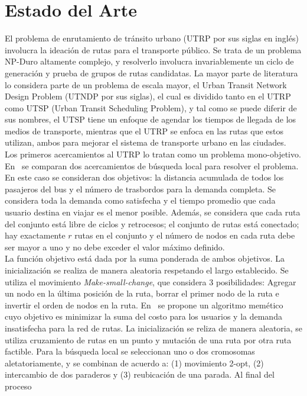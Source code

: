 \documentclass{llncs}
\begin{document}
\section{Estado del Arte}
El problema de enrutamiento de tr\'ansito urbano (UTRP por sus siglas en ingl\'es) involucra la ideaci\'on de rutas para el transporte p\'ublico.
Se trata de un problema NP-Duro altamente complejo, y resolverlo involucra invariablemente un ciclo de
generaci\'on y prueba de grupos de rutas candidatas. La mayor parte de literatura lo considera parte de un problema de escala mayor, el Urban Transit Network Design Problem (UTNDP por sus siglas),
el cual es dividido tanto en el UTRP como UTSP (Urban Transit Scheduling Problem), y tal como se puede diferir de sus nombres, el UTSP
tiene un enfoque de agendar los tiempos de llegada de los medios de transporte, mientras que el UTRP se enfoca en las rutas que estos
utilizan, ambos para mejorar el sistema de transporte urbano en las ciudades.\\
Los primeros acercamientos al UTRP lo tratan como un problema mono-objetivo. En~\cite{metaheuristic2010} se
comparan dos acercamientos de b\'usqueda local para resolver el problema. En este
caso se consideran dos objetivos: la distancia acumulada de todos los pasajeros
del bus y el n\'umero de trasbordos para la demanda completa. Se considera toda la demanda como satisfecha y el tiempo
promedio que cada usuario destina en viajar es
el menor posible. Adem\'as, se considera que cada ruta del conjunto est\'a libre de ciclos y retrocesos;
el conjunto de rutas est\'a conectado; hay exactamente $r$ rutas en el conjunto y el n\'umero de nodos en cada
ruta debe ser mayor a uno y no debe exceder el valor m\'aximo definido. \\
La funci\'on objetivo est\'a dada por la suma ponderada de ambos objetivos.
La inicializaci\'on se realiza de manera aleatoria respetando el largo establecido. Se
utiliza el movimiento \emph{Make-small-change}, que considera 3 posibilidades: Agregar un nodo en
la \'ultima posici\'on de la ruta, borrar el primer nodo de la ruta e invertir el orden de nodos en la ruta.
En~\cite{memetic2011} se propone un algoritmo mem\'etico cuyo objetivo es minimizar la suma del costo
para los usuarios y la demanda insatisfecha para la red de rutas. La inicializaci\'on se reliza
de manera aleatoria, se utiliza cruzamiento de rutas en un punto y mutaci\'on de una ruta por otra ruta factible. Para
la b\'usqueda local se seleccionan uno o dos cromosomas aletatoriamente, y se combinan de acuerdo a: (1) 
movimiento 2-opt, (2) intercambio de dos paraderos y (3) reubicaci\'on de una parada. Al final del proceso
\end{document}
